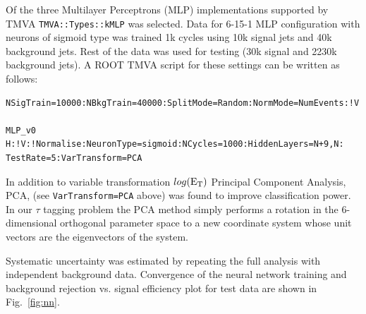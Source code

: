 \documentclass[a4paper]{jpconf}
\begin{document}


Of the three Multilayer Perceptrons (MLP) implementations supported by TMVA
{\tt TMVA::Types::kMLP} was selected.
Data for 6-15-1 MLP configuration with neurons of sigmoid type was trained 1k cycles using
10k signal jets and 40k background jets. 
Rest of the data was used for testing (30k signal and 2230k background jets).
A ROOT TMVA script for these settings can be written as follows:
 
\begin{verbatim}
NSigTrain=10000:NBkgTrain=40000:SplitMode=Random:NormMode=NumEvents:!V

MLP_v0  H:!V:!Normalise:NeuronType=sigmoid:NCycles=1000:HiddenLayers=N+9,N:
TestRate=5:VarTransform=PCA
\end{verbatim}

In addition to variable transformation $log({\rm E}_{\rm T})$ 
Principal Component Analysis, PCA, (see {\tt  VarTransform=PCA} above) was found to improve 
classification power.
In our $\tau$ tagging problem the PCA method simply performs a rotation 
in the 6-dimensional orthogonal parameter space to a new coordinate system whose unit vectors
are the eigenvectors of the system. 


Systematic uncertainty was estimated by repeating the full analysis with independent background data.
Convergence of the neural network training and 
background rejection vs. signal efficiency plot  for test data are shown in Fig.~\ref{fig:nn}.
\end{document}
